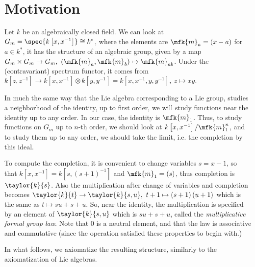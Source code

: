 \section{Motivation}

Let $k$ be an algebraically closed field.
We can look at $G_m = \spec{k\left[x,x^{-1}\right]} \cong k^*$,
where the elements are $\mfk{m}_a = \left(x-a\right)$ for $a \in k^*$,
it has the structure of an algebraic group, given by a map
$
	G_m \times G_m \to G_m,\ 
	\left(\mfk{m}_a,\mfk{m}_b\right) \mapsto \mfk{m}_{ab}
$.
Under the (contravariant) spectrum functor, it comes from
$
	k\left[z,z^{-1}\right]
	\to
	k\left[x,x^{-1}\right] \otimes k\left[y,y^{-1}\right]
	= k\left[x,x^{-1},y,y^{-1}\right]
	,\ 
	z \mapsto xy
$.

In much the same way that the Lie algebra corresponding to a Lie group, studies a neighborhood of the identity, up to first order,
we will study functions near the identity up to any order.
In our case, the identity is $\mfk{m}_1$.
Thus, to study functions on $G_m$ up to $n$-th order, we should look at $k\left[x,x^{-1}\right] / \mfk{m}_1^n$, and to study them up to any order, we should take the limit, i.e. the completion by this ideal.

To compute the completion, it is convenient to change variables $s = x-1$, so that $k\left[x,x^{-1}\right] = k\left[s,\left(s+1\right)^{-1}\right]$ and $\mfk{m}_1 = \left(s\right)$, thus completion is $\taylor{k}{s}$.
Also the multiplication after change of variables and completion becomes
$
	\taylor{k}{t}
	\to
	\taylor{k}{s,u},\ 
	t+1 \mapsto \left(s+1\right)\left(u+1\right)
$
which is the same as $t \mapsto su+s+u$.
So, near the identity, the multiplication is specified by an element of $\taylor{k}{s,u}$ which is $su+s+u$, called the \emph{multiplicative formal group law}.
Note that $0$ is a neutral element, and that the law is associative and commutative (since the operation satisfied these properties to begin with.)

In what follows, we axiomatize the resulting structure, similarly to the axiomatization of Lie algebras.